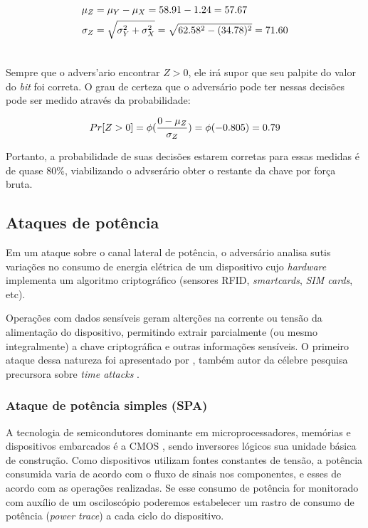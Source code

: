 \begin{align}\notag
    \mu_{Z} &= \mu_{Y} - \mu_{X} = 58.91 - 1.24 = 57.67\\\notag
    \sigma_{Z} &= \sqrt{ \sigma_{Y}^{2} + \sigma_{X}^{2}} = \sqrt{ 62.58^{2} - (34.78)^{2}} = 71.60\\ \notag
\end{align}

Sempre que o advers'{a}rio encontrar $Z > 0$, ele ir\'{a} supor que seu palpite do valor do \textit{bit} foi correta. O grau de certeza que o advers\'{a}rio pode ter nessas decis\~{o}es pode ser medido atrav\'{e}s da probabilidade:

\begin{align}
    Pr[Z > 0] = \phi(\dfrac{0 - \mu_{Z}}{\sigma_{Z}}) = \phi(-0.805) = 0.79\notag
\end{align}

Portanto, a probabilidade de suas decis\~{o}es estarem corretas para essas medidas \'{e} de quase 80\%, viabilizando o advser\'{a}rio obter o restante da chave por for\c{c}a bruta.

\subsection{Ataques de potência}

Em um ataque sobre o canal lateral de pot\^{e}ncia, o advers\'{a}rio analisa sutis varia\c{c}\~{o}es no consumo de energia el\'{e}trica de um dispositivo cujo \textit{hardware} implementa um algoritmo criptogr\'{a}fico (sensores RFID, \textit{smartcards}, \textit{SIM cards}, etc).

Opera\c{c}\~{o}es com dados sens\'{i}veis geram alter\c{c}\~{o}es na corrente ou tens\~{a}o da alimenta\c{c}\~{a}o do dispositivo, permitindo extrair parcialmente (ou mesmo integralmente) a chave criptogr\'{a}fica e outras informa\c{c}\~{o}es  sens\'{i}veis. O primeiro ataque dessa natureza foi apresentado por \cite{Kocher:1999:DPA:646764.703989}, tamb\'{e}m autor da c\'{e}lebre pesquisa precursora sobre \textit{time attacks} \cite{Kocher96}. 

\subsubsection{Ataque de potência simples (SPA)}
A tecnologia de semicondutores dominante em microprocessadores, mem\'{o}rias e dispositivos embarcados \'{e} a CMOS   \cite{sedra:1997}, sendo inversores l\'{o}gicos sua unidade b\'{a}sica de constru\c{c}\~{a}o. Como dispositivos utilizam fontes constantes de tens\~{a}o, a pot\^{e}ncia consumida varia de acordo com o fluxo de sinais nos componentes, e esses de acordo com as opera\c{c}\~{o}es realizadas. Se esse consumo de pot\^{e}ncia for monitorado com aux\'{i}lio de um oscilosc\'{o}pio poderemos estabelecer um rastro de consumo de pot\^{e}ncia (\textit{power trace}) a cada ciclo do dispositivo.

